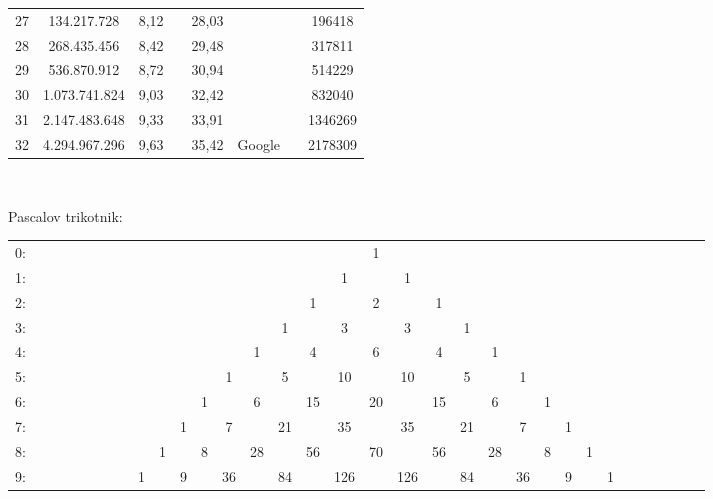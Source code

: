 \documentclass[a4paper,oneside,12pt]{article}
\newenvironment{description*}%
{
\begin{description}
\setlength{\itemsep}{0pt}
\setlength{\parskip}{2pt}
}
{\end{description}}
\begin{document}
\begin{description*}
\begin{tabular}[h]{|c|c|c|c|c|c|c|c|}
       27 &   134.217.728 & 8,12 &          & 28,03 &                 &         & 196418 \\
       28 &   268.435.456 & 8,42 &          & 29,48 &                 &         & 317811 \\
       29 &   536.870.912 & 8,72 &          & 30,94 &                 &         & 514229 \\
       30 & 1.073.741.824 & 9,03 &          & 32,42 &                 &         & 832040 \\
       31 & 2.147.483.648 & 9,33 &          & 33,91 &                 &         & 1346269 \\
       32 & 4.294.967.296 & 9,63 &          & 35,42 & Google          &         & 2178309 \\
    \end{tabular} \\[12pt]
  \item[Pascalov trikotnik:] \mbox{} \\[12pt]
    \tabcolsep=0.03cm
    \hspace*{-20pt}
    \begin{tabular}{rccccccccccccccccccccccccccccccc}
     0:~~&    &    &    &    &    &    &    &    &    &    &    &    &    &    &    &  1\\
     1:~~&    &    &    &    &    &    &    &    &    &    &    &    &    &    &  1 &    &  1\\
     2:~~&    &    &    &    &    &    &    &    &    &    &    &    &    &  1 &    &  2 &    &  1\\
     3:~~&    &    &    &    &    &    &    &    &    &    &    &    &  1 &    &  3 &    &  3 &    &  1\\
     4:~~&    &    &    &    &    &    &    &    &    &    &    &  1 &    &  4 &    &  6 &    &  4 &    &  1\\
     5:~~&    &    &    &    &    &    &    &    &    &    &  1 &    &  5 &    & 10 &    & 10 &    &  5 &    &  1\\
     6:~~&    &    &    &    &    &    &    &    &    &  1 &    &  6 &    & 15 &    & 20 &    & 15 &    &  6 &    &  1\\
     7:~~&    &    &    &    &    &    &    &    &  1 &    &  7 &    & 21 &    & 35 &    & 35 &    & 21 &    &  7 &    &  1\\
     8:~~&    &    &    &    &    &    &    &  1 &    &  8 &    & 28 &    & 56 &    & 70 &    & 56 &    & 28 &    &  8 &    &  1\\
     9:~~&    &    &    &    &    &    &  1 &    &  9 &    & 36 &    & 84 &    & 126 &    & 126 &    & 84 &    & 36 &    &  9 &    &  1\\

\end{tabular}
\end{description*}
\end{document}
